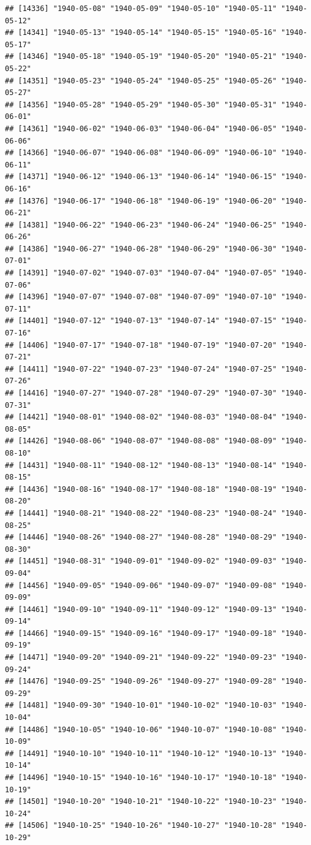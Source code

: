 \documentclass{article}\usepackage[]{graphicx}\usepackage[]{color}
\makeatletter
\newenvironment{kframe}{%
 \def\at@end@of@kframe{}%
 \ifinner\ifhmode%
  \def\at@end@of@kframe{\end{minipage}}%
  \begin{minipage}{\columnwidth}%
 \fi\fi%
 \def\FrameCommand##1{\hskip\@totalleftmargin \hskip-\fboxsep
 \colorbox{shadecolor}{##1}\hskip-\fboxsep
     \hskip-\linewidth \hskip-\@totalleftmargin \hskip\columnwidth}%
 \MakeFramed {\advance\hsize-\width
   \@totalleftmargin\z@ \linewidth\hsize
   \@setminipage}}%
 {\par\unskip\endMakeFramed%
 \at@end@of@kframe}
\newenvironment{knitrout}{}{} %
\makeatother
\begin{document}
\begin{description}
\begin{knitrout}
\begin{kframe}
\begin{verbatim}
## [14336] "1940-05-08" "1940-05-09" "1940-05-10" "1940-05-11" "1940-05-12"
## [14341] "1940-05-13" "1940-05-14" "1940-05-15" "1940-05-16" "1940-05-17"
## [14346] "1940-05-18" "1940-05-19" "1940-05-20" "1940-05-21" "1940-05-22"
## [14351] "1940-05-23" "1940-05-24" "1940-05-25" "1940-05-26" "1940-05-27"
## [14356] "1940-05-28" "1940-05-29" "1940-05-30" "1940-05-31" "1940-06-01"
## [14361] "1940-06-02" "1940-06-03" "1940-06-04" "1940-06-05" "1940-06-06"
## [14366] "1940-06-07" "1940-06-08" "1940-06-09" "1940-06-10" "1940-06-11"
## [14371] "1940-06-12" "1940-06-13" "1940-06-14" "1940-06-15" "1940-06-16"
## [14376] "1940-06-17" "1940-06-18" "1940-06-19" "1940-06-20" "1940-06-21"
## [14381] "1940-06-22" "1940-06-23" "1940-06-24" "1940-06-25" "1940-06-26"
## [14386] "1940-06-27" "1940-06-28" "1940-06-29" "1940-06-30" "1940-07-01"
## [14391] "1940-07-02" "1940-07-03" "1940-07-04" "1940-07-05" "1940-07-06"
## [14396] "1940-07-07" "1940-07-08" "1940-07-09" "1940-07-10" "1940-07-11"
## [14401] "1940-07-12" "1940-07-13" "1940-07-14" "1940-07-15" "1940-07-16"
## [14406] "1940-07-17" "1940-07-18" "1940-07-19" "1940-07-20" "1940-07-21"
## [14411] "1940-07-22" "1940-07-23" "1940-07-24" "1940-07-25" "1940-07-26"
## [14416] "1940-07-27" "1940-07-28" "1940-07-29" "1940-07-30" "1940-07-31"
## [14421] "1940-08-01" "1940-08-02" "1940-08-03" "1940-08-04" "1940-08-05"
## [14426] "1940-08-06" "1940-08-07" "1940-08-08" "1940-08-09" "1940-08-10"
## [14431] "1940-08-11" "1940-08-12" "1940-08-13" "1940-08-14" "1940-08-15"
## [14436] "1940-08-16" "1940-08-17" "1940-08-18" "1940-08-19" "1940-08-20"
## [14441] "1940-08-21" "1940-08-22" "1940-08-23" "1940-08-24" "1940-08-25"
## [14446] "1940-08-26" "1940-08-27" "1940-08-28" "1940-08-29" "1940-08-30"
## [14451] "1940-08-31" "1940-09-01" "1940-09-02" "1940-09-03" "1940-09-04"
## [14456] "1940-09-05" "1940-09-06" "1940-09-07" "1940-09-08" "1940-09-09"
## [14461] "1940-09-10" "1940-09-11" "1940-09-12" "1940-09-13" "1940-09-14"
## [14466] "1940-09-15" "1940-09-16" "1940-09-17" "1940-09-18" "1940-09-19"
## [14471] "1940-09-20" "1940-09-21" "1940-09-22" "1940-09-23" "1940-09-24"
## [14476] "1940-09-25" "1940-09-26" "1940-09-27" "1940-09-28" "1940-09-29"
## [14481] "1940-09-30" "1940-10-01" "1940-10-02" "1940-10-03" "1940-10-04"
## [14486] "1940-10-05" "1940-10-06" "1940-10-07" "1940-10-08" "1940-10-09"
## [14491] "1940-10-10" "1940-10-11" "1940-10-12" "1940-10-13" "1940-10-14"
## [14496] "1940-10-15" "1940-10-16" "1940-10-17" "1940-10-18" "1940-10-19"
## [14501] "1940-10-20" "1940-10-21" "1940-10-22" "1940-10-23" "1940-10-24"
## [14506] "1940-10-25" "1940-10-26" "1940-10-27" "1940-10-28" "1940-10-29"

\end{verbatim}
\end{kframe}
\end{knitrout}
\end{description}
\end{document}

